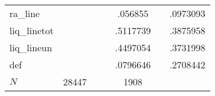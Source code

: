 \begin{table}[htbp]
\begin{tabular}{l*{2}{ccc}}
ra\_line     &            &            &            &     .056855&            &    .0973093\\
liq\_linetot &            &            &            &    .5117739&            &    .3875958\\
liq\_lineun  &            &            &            &    .4497054&            &    .3731998\\
def         &            &            &            &    .0796646&            &    .2708442\\
\hline
\(N\)       &       28447&            &            &        1908&            &            \\
\hline\hline
\end{tabular}
\end{table}
